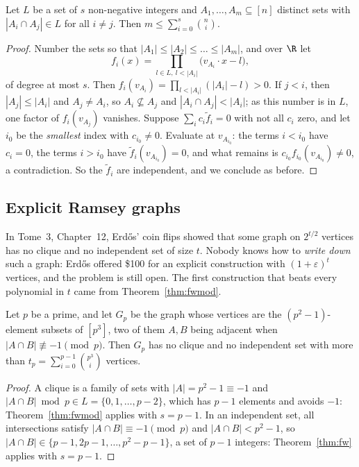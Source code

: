 \begin{theorem}\label{thm:fw}
Let $L$ be a set of $s$ non-negative integers and $A_1,\dots,A_m\subseteq[n]$ distinct sets with $|A_i\cap A_j|\in L$ for all $i\ne j$. Then $m\le\sum_{i=0}^s\binom ni$.
\end{theorem}
\begin{proof}
Number the sets so that $|A_1|\le|A_2|\le\dots\le|A_m|$, and over $\R$ let
\[
f_i(x)=\prod_{l\in L,\ l<|A_i|}\bigl(v_{A_i}\cdot x-l\bigr),
\]
of degree at most $s$. Then $f_i(v_{A_i})=\prod_{l<|A_i|}(|A_i|-l)>0$. If $j<i$, then $|A_j|\le|A_i|$ and $A_j\ne A_i$, so $A_i\not\subseteq A_j$ and $|A_i\cap A_j|<|A_i|$; as this number is in $L$, one factor of
$f_i(v_{A_j})$ vanishes. Suppose $\sum_ic_i\tilde f_i=0$ with not all $c_i$ zero, and let $i_0$ be the \emph{smallest} index with $c_{i_0}\ne0$. Evaluate at $v_{A_{i_0}}$: the terms $i<i_0$ have $c_i=0$, the terms $i>i_0$ have
$\tilde f_i(v_{A_{i_0}})=0$, and what remains is $c_{i_0}f_{i_0}(v_{A_{i_0}})\ne0$, a contradiction. So the $\tilde f_i$ are independent, and we conclude as before.
\end{proof}

\subsection*{Explicit Ramsey graphs}

In Tome~3, Chapter~12, Erd\H os' coin flips showed that some graph on $2^{t/2}$ vertices has no clique and no independent set of size $t$. Nobody knows how to \emph{write down} such a graph: Erd\H os offered
\$100 for an explicit construction with $(1+\varepsilon)^t$ vertices, and the problem is still open. The first construction that beats every polynomial in $t$ came from Theorem~\ref{thm:fwmod}.

\begin{theorem}\label{thm:explicitramsey}
Let $p$ be a prime, and let $G_p$ be the graph whose vertices are the $(p^2-1)$-element subsets of $[p^3]$, two of them $A,B$ being adjacent when $|A\cap B|\not\equiv-1\pmod p$. Then $G_p$ has no clique and no
independent set with more than $t_p=\sum_{i=0}^{p-1}\binom{p^3}i$ vertices.
\end{theorem}
\begin{proof}
A clique is a family of sets with $|A|=p^2-1\equiv-1$ and $|A\cap B|\bmod p\in L=\{0,1,\dots,p-2\}$, which has $p-1$ elements and avoids $-1$: Theorem~\ref{thm:fwmod} applies with $s=p-1$. In an independent set, all
intersections satisfy $|A\cap B|\equiv-1\pmod p$ and $|A\cap B|<p^2-1$, so $|A\cap B|\in\{p-1,2p-1,\dots,p^2-p-1\}$, a set of $p-1$ integers: Theorem~\ref{thm:fw} applies with $s=p-1$.
\end{proof}


